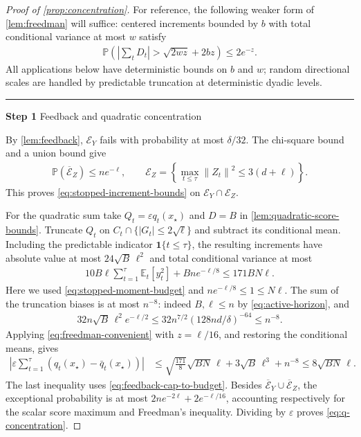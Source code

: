 \documentclass{article}
\newcommand{\proofstep}[2]{%
    \par\medskip
    \noindent
    \textcolor{blue!55!black}{\rule{2pt}{1.2em}}%
    \hspace{0.6em}%
    {\sffamily\bfseries\color{blue!55!black}Step #1}%
    \quad
    {\sffamily #2}%
    \par\smallskip
}
\newcommand{\E}{\mathbb E}
\newcommand{\Pp}{\mathbb P}
\newcommand{\1}{\mathbf 1}
\newcommand{\eps}{\varepsilon}
\newcommand{\norm}[1]{\left\lVert #1\right\rVert}
\begin{document}
\begin{proof}[Proof of \cref{prop:concentration}]
    For reference, the following weaker form of \cref{lem:freedman}
    will suffice: centered increments bounded by $b$ with total
    conditional variance at most $w$ satisfy
    \begin{align}
        \Pp\left(\left|\sum_tD_t\right|>\sqrt{2wz}+2bz\right)
        \leq2e^{-z}.
        \label{eq:freedman-convenient}
    \end{align}
    All applications below have deterministic bounds on $b$ and $w$;
    random directional scales are handled by predictable truncation at
    deterministic dyadic levels.

    \proofstep{1}{Feedback and quadratic concentration}
    By \cref{lem:feedback}, $\mathcal E_Y$ fails with probability at most
    $\delta/32$. The chi-square bound and a union bound give
    \begin{align}
        \Pp(\overline{\mathcal E}_Z)\leq ne^{-\ell},
        \qquad
        \mathcal E_Z=\left\{
        \max_{t\leq\tau}\norm{Z_t}^2\leq3(d+\ell)\right\}.
        \label{eq:Z-norm-union}
    \end{align}
    This proves \eqref{eq:stopped-increment-bounds} on
    $\mathcal E_Y\cap\mathcal E_Z$.

    For the quadratic sum take $Q_t=\eps q_t(x_\star)$ and
    $D=B$ in \cref{lem:quadratic-score-bounds}. Truncate $Q_t$ on
    $C_t\cap\{|G_t|\leq2\sqrt\ell\}$ and subtract its conditional mean.
    Including the predictable indicator $\1\{t\leq\tau\}$, the resulting
    increments have absolute value at most $24\sqrt B\,\ell^2$ and total
    conditional variance at most
    \begin{align}
        10B\ell\sum_{t=1}^\tau\E_t[y_t^2]+Bn e^{-\ell/8}
        \leq171BN\ell.
        \label{eq:global-q-variance}
    \end{align}
    Here we used \eqref{eq:stopped-moment-budget} and
    $ne^{-\ell/8}\leq1\leq N\ell$.
    The sum of the truncation biases is at most $n^{-8}$: indeed
    $B,\ell\leq n$ by \eqref{eq:active-horizon}, and
    \begin{align}
        32n\sqrt B\,\ell^2 e^{-\ell/2}
        \leq32n^{7/2}(128nd/\delta)^{-64}\leq n^{-8}.
        \label{eq:scalar-total-bias}
    \end{align}
    Applying \eqref{eq:freedman-convenient} with $z=\ell/16$, and
    restoring the conditional means, gives
    \begin{align}
        \left|\eps\sum_{t=1}^\tau
        (q_t(x_\star)-\bar{q}_t(x_\star))\right|
         & \leq\sqrt{\frac{171}{8}}\sqrt{BN}\,\ell
        +3\sqrt B\,\ell^3+n^{-8}
        \leq8\sqrt{BN}\,\ell.
    \end{align}
    The last inequality uses \eqref{eq:feedback-cap-to-budget}.
    Besides $\overline{\mathcal E}_Y\cup\overline{\mathcal E}_Z$, the exceptional probability
    is at most $2ne^{-2\ell}+2e^{-\ell/16}$, accounting respectively for
    the scalar score maximum and Freedman's inequality.
    Dividing by $\eps$ proves \eqref{eq:q-concentration}.


\end{proof}
\end{document}
